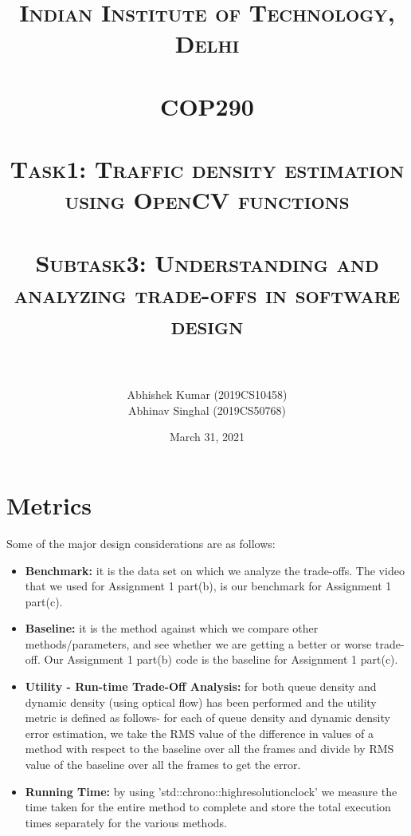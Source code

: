 \documentclass[paper=a4, fontsize = 12pt]{scrartcl}
\title{
		\usefont{OT1}{bch}{b}{n}
		\normalfont \normalsize \textsc{Indian Institute of Technology, Delhi} \\ [25pt]
		\horrule{0.5pt} \\[0.4cm]
		\normalfont \huge \textsc{COP290}  \\

		\normalfont \normalsize \textsc{\\ Task1: Traffic density estimation using OpenCV functions} \\
		\normalfont \normalsize \textsc{\\ Subtask3: Understanding and analyzing trade-offs in software design} \\
		\horrule{2pt} \\[0.5cm]
}
\author{
		\normalfont 								\normalsize
		Abhishek Kumar (2019CS10458) \\ [-3pt]		\normalsize
        Abhinav Singhal (2019CS50768) 	
}
\date{\normalfont \normalsize March 31, 2021 }
\numberwithin{equation}{section}		%
\numberwithin{figure}{section}			%
\numberwithin{table}{section}				%
\begin{document}
\maketitle


\section{Metrics}
Some of the major design considerations are as follows: 
\begin{itemize}
    \item \textbf{Benchmark:} it is the data set on which we analyze the trade-offs. The video that we used for Assignment 1 part(b), is our benchmark for Assignment 1 part(c). 
    
    \item \textbf{Baseline:} it is the method against which we compare other methods/parameters, and see whether we are getting a better or worse trade-off. Our Assignment 1 part(b) code is the baseline for Assignment 1 part(c). 
    
    \item \textbf{Utility - Run-time Trade-Off Analysis:} for both queue density and dynamic density (using optical flow) has been performed and the utility metric is defined as follows- for each of queue density and dynamic density error estimation, we take the RMS value of the difference in values of a method with respect to the baseline over all the frames and divide by RMS value of the baseline over all the frames to get the error. 
    
    \item \textbf{Running Time:} by using 'std::chrono::high\textunderscore{}resolution\textunderscore{}clock' we measure the time taken for the entire method to complete and store the total execution times separately for the various methods.
\end{itemize}
\end{document}
